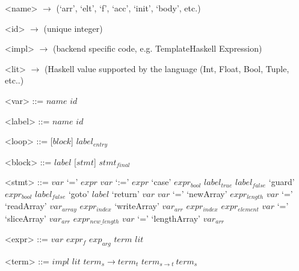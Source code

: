 
\setlength{\grammarindent}{5em} %
\renewcommand{\syntleft}{\normalfont\itshape} %
\renewcommand{\syntright}{}
\renewcommand{\litleft}{\ttfamily} %
\renewcommand{\litright}{}

\setlength{\grammarparsep}{0pt} %

\begin{grammar}
<name> $\rightarrow$ (`arr', `elt', `f', `acc', `init', `body', etc.)

<id>   $\rightarrow$ (unique integer\footnotemark)

<impl> $\rightarrow$ (backend specific code, e.g. TemplateHaskell Expression)

<lit>  $\rightarrow$ (Haskell value supported by the language (Int, Float, Bool, Tuple, etc..)

<var>  ::= $name$ $id$

<label> ::= $name$ $id$

\end{grammar}

\setlength{\grammarparsep}{10pt plus 1pt minus 1pt} %
\begin{grammar}
<loop> ::= [$block$] $label_{entry}$

<block> ::= $label$ [$stmt$] $stmt_{final}$

<stmt> ::= $var$ `=' $expr$
      \alt $var$ `:=' $expr$
      \alt `case' $expr_{bool}$ $label_{true}$ $label_{false}$
      \alt `guard' $expr_{bool}$ $label_{false}$
      \alt `goto' $label$
      \alt `return' $var$
      \alt $var$ `=' `newArray' $expr_{length}$
      \alt $var$ `=' `readArray' $var_{array}$ $expr_{index}$
      \alt `writeArray' $var_{arr}$ $expr_{index}$ $expr_{element}$
      \alt $var$ `=' `sliceArray' $var_{arr}$ $expr_{new\_length}$
      \alt $var$ `=' `lengthArray' $var_{arr}$

<expr> ::= $var$
      \alt $expr_{\mathit{f}}$ $exp_{arg}$
      \alt $term$
      \alt $lit$

<term> ::= $impl$
      \alt $lit$
      \alt $term_{s} \rightarrow term_{t}$
      \alt $term_{s \rightarrow t}\ term_{s}$

\end{grammar}
